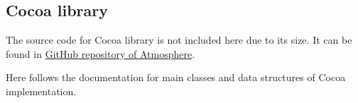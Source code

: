 \subsection{Cocoa library}

The source code for Cocoa library is not included here due to its size. It can be found in \href{https://github.com/vojto/atmos2-cocoa}{GitHub repository of Atmosphere}.

Here follows the documentation for main classes and data structures of Cocoa implementation.















